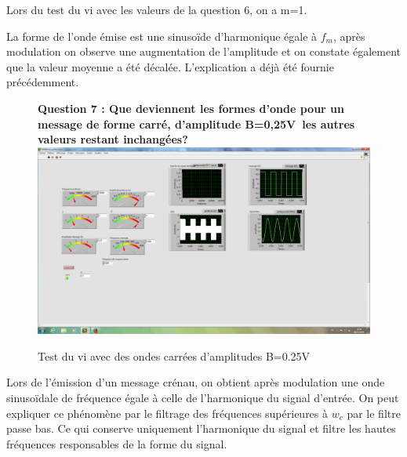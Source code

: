 \documentclass[french, a4paper,12pt, titlepage]{article}
\begin{document}
Lors du test du vi avec les valeurs de la question 6, on a m=1.

La forme de l'onde émise est une sinusoïde d'harmonique égale à $f_m$, après modulation on observe une augmentation de l'amplitude
et on constate également que la valeur moyenne a été décalée.
L'explication a déjà été fournie précédemment.

\begin{figure}[!h]
	\textbf{Question 7 : Que deviennent les formes d’onde pour un message de forme carré, d’amplitude B=0,25V les autres valeurs restant inchangées? \\}
	\includegraphics[width=\textwidth]{question7.png}
	\caption{	Test du vi avec des ondes carrées d'amplitudes B=0.25V }
\end{figure}

Lors de l'émission d'un message crénau, on obtient après modulation une onde sinusoïdale de fréquence égale à celle de l'harmonique du signal d'entrée.
On peut expliquer ce phénomène par le filtrage des fréquences supérieures à $w_c$ par le filtre passe bas. Ce qui conserve uniquement l'harmonique du signal
et filtre les hautes fréquences responsables de la forme du signal.
\end{document}
